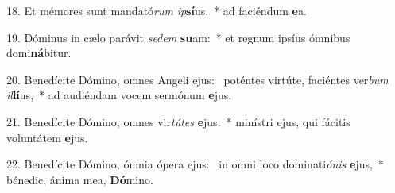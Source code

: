 18. Et mémores sunt mandató\textit{rum} \textit{ip}\textbf{sí}us,~*  ad faciéndum \textbf{e}a.\

19. Dóminus in cælo parávit \textit{se}\textit{dem} \textbf{su}am:~*  et regnum ipsíus ómnibus domi\textbf{ná}bitur.\

20. Benedícite Dómino, omnes Angeli ejus: \dag\  poténtes virtúte, faciéntes ver\textit{bum} \textit{il}\textbf{lí}us,~*  ad audiéndam vocem sermónum \textbf{e}jus.\

21. Benedícite Dómino, omnes vir\textit{tú}\textit{tes} \textbf{e}jus:~*  minístri ejus, qui fácitis voluntátem \textbf{e}jus.\

22. Benedícite Dómino, ómnia ópera ejus: \dag\  in omni loco dominati\textit{ó}\textit{nis} \textbf{e}jus,~*  bénedic, ánima mea, \textbf{Dó}mino.\

